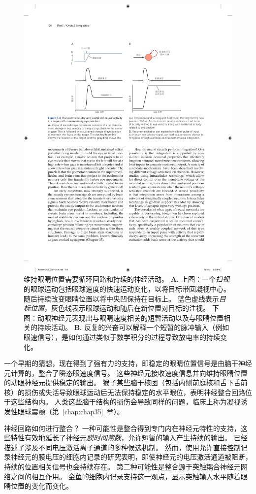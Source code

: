 \begin{figure}[htbp]
	\centering
	\includegraphics[width=0.9\linewidth]{chap05/fig_5_6}
	\caption{维持眼睛位置需要循环回路和持续的神经活动。
		\textbf{A.} 上图：一个\textit{扫视}的眼球运动包括眼球速度的快速运动变化，以将目标带回凝视中心。
		随后持续改变眼睛位置以将中央凹保持在目标上。
		蓝色虚线表示\textit{目标位置}，灰色线表示眼球运动和随后在新位置对目标的注视。
		下图：动眼神经元表现出与眼睛速度相关的短暂活动以及与眼睛位置相关的持续活动。
		\textbf{B.} 反复的兴奋可以解释一个短暂的脉冲输入（例如眼速信号），是如何通过类似于数学积分的过程导致放电率的持续变化。}
	\label{fig:5_6}
\end{figure}


一个早期的猜想，现在得到了强有力的支持，即稳定的眼睛位置信号是由脑干神经元计算的，整合了瞬态眼速度信号。
这些神经元接收速度信息并向维持眼睛位置的动眼神经元提供稳定的输出。 
猴子某些脑干核团（包括内侧前庭核和舌下舌前核）的损伤或失活导致眼球运动后无法保持稳定的水平眼位，表明神经整合回路位于这些结构内。 
人类这些脑干结构的损伤会导致同样的问题，临床上称为凝视诱发性眼球震颤（第~\ref{chap:chap35}~章）。


神经回路如何进行整合？
一种可能性是整合得到专门内在神经元特性的支持，这些特性有效地延长了神经元\textit{膜时间常数}，允许短暂的输入产生持续的输出。
已经描述了涉及不同电压激活离子通道的多种候选机制。 
然而，使用允许直接控制记录神经元的膜电压的细胞内记录的研究表明，即使神经元的电压激活通道被阻断，持续的位置相关信号也会持续存在。 
第二种可能性是整合源于突触耦合神经元网络之间的相互作用。 
金鱼的细胞内记录支持这一观点，显示突触输入水平随着眼睛位置的变化而变化。



